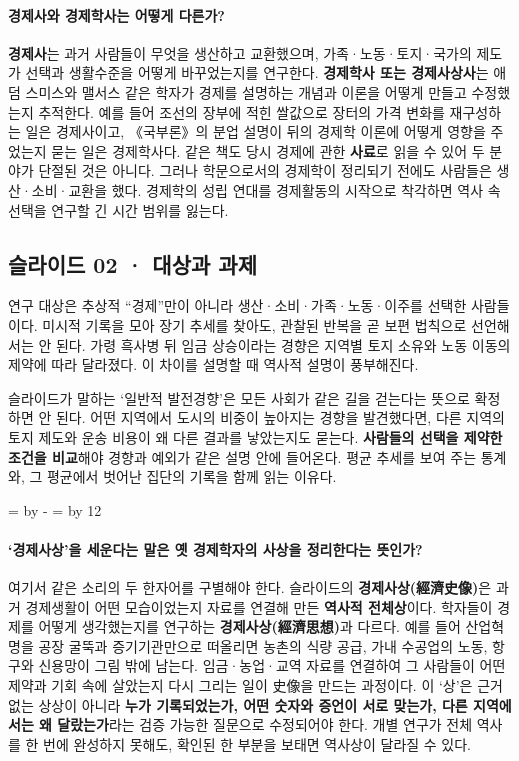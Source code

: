 \documentclass[10pt,a4paper]{article}
\newcommand{\ReserveQuestionSpace}{%
  \par\begingroup
  \dimen0=\pagegoal \advance\dimen0 by -\pagetotal
  \dimen2=\baselineskip \multiply\dimen2 by 12
  \ifdim\dimen0<\dimen2 \newpage\fi
  \endgroup}
\begin{document}
\paragraph{경제사와 경제학사는 어떻게 다른가?}
\textbf{경제사}는 과거 사람들이 무엇을 생산하고 교환했으며, 가족·노동·토지·국가의 제도가 선택과 생활수준을 어떻게 바꾸었는지를 연구한다. \textbf{경제학사 또는 경제사상사}는 애덤 스미스와 맬서스 같은 학자가 경제를 설명하는 개념과 이론을 어떻게 만들고 수정했는지 추적한다. 예를 들어 조선의 장부에 적힌 쌀값으로 장터의 가격 변화를 재구성하는 일은 경제사이고, 《국부론》의 분업 설명이 뒤의 경제학 이론에 어떻게 영향을 주었는지 묻는 일은 경제학사다. 같은 책도 당시 경제에 관한 \textbf{사료}로 읽을 수 있어 두 분야가 단절된 것은 아니다. 그러나 학문으로서의 경제학이 정리되기 전에도 사람들은 생산·소비·교환을 했다. 경제학의 성립 연대를 경제활동의 시작으로 착각하면 역사 속 선택을 연구할 긴 시간 범위를 잃는다.\par

\subsection{슬라이드 02 · 대상과 과제}
연구 대상은 추상적 “경제”만이 아니라 생산·소비·가족·노동·이주를 선택한 사람들이다. 미시적 기록을 모아 장기 추세를 찾아도, 관찰된 반복을 곧 보편 법칙으로 선언해서는 안 된다. 가령 흑사병 뒤 임금 상승이라는 경향은 지역별 토지 소유와 노동 이동의 제약에 따라 달라졌다. 이 차이를 설명할 때 역사적 설명이 풍부해진다.\par

슬라이드가 말하는 ‘일반적 발전경향’은 모든 사회가 같은 길을 걷는다는 뜻으로 확정하면 안 된다. 어떤 지역에서 도시의 비중이 높아지는 경향을 발견했다면, 다른 지역의 토지 제도와 운송 비용이 왜 다른 결과를 낳았는지도 묻는다. \textbf{사람들의 선택을 제약한 조건을 비교}해야 경향과 예외가 같은 설명 안에 들어온다. 평균 추세를 보여 주는 통계와, 그 평균에서 벗어난 집단의 기록을 함께 읽는 이유다.\par

\ReserveQuestionSpace
\paragraph{‘경제사상’을 세운다는 말은 옛 경제학자의 사상을 정리한다는 뜻인가?}
여기서 같은 소리의 두 한자어를 구별해야 한다. 슬라이드의 \textbf{경제사상(經濟史像)}은 과거 경제생활이 어떤 모습이었는지 자료를 연결해 만든 \textbf{역사적 전체상}이다. 학자들이 경제를 어떻게 생각했는지를 연구하는 \textbf{경제사상(經濟思想)}과 다르다. 예를 들어 산업혁명을 공장 굴뚝과 증기기관만으로 떠올리면 농촌의 식량 공급, 가내 수공업의 노동, 항구와 신용망이 그림 밖에 남는다. 임금·농업·교역 자료를 연결하여 그 사람들이 어떤 제약과 기회 속에 살았는지 다시 그리는 일이 史像을 만드는 과정이다. 이 ‘상’은 근거 없는 상상이 아니라 \textbf{누가 기록되었는가, 어떤 숫자와 증언이 서로 맞는가, 다른 지역에서는 왜 달랐는가}라는 검증 가능한 질문으로 수정되어야 한다. 개별 연구가 전체 역사를 한 번에 완성하지 못해도, 확인된 한 부분을 보태면 역사상이 달라질 수 있다.\par
\end{document}
